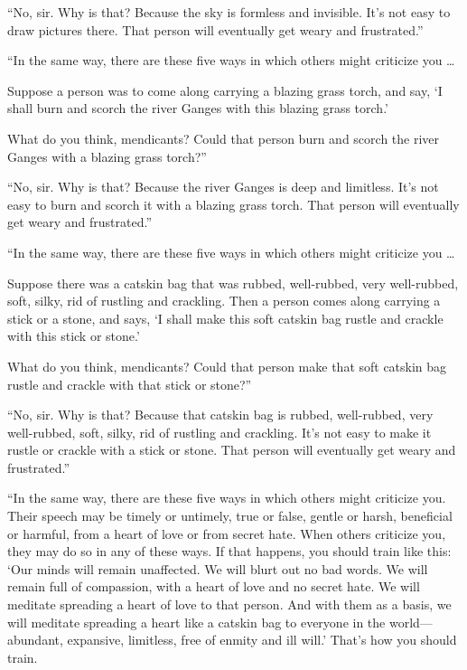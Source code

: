\documentclass[12pt,openany]{book}%
\begin{document}
“No, sir. Why is that? Because the sky is formless and invisible. It’s not easy to draw pictures there. That person will eventually get weary and frustrated.” 

“In the same way, there are these five ways in which others might criticize you … 

Suppose a person was to come along carrying a blazing grass torch, and say, ‘I shall burn and scorch the river Ganges with this blazing grass torch.’ 

What do you think, mendicants? Could that person burn and scorch the river Ganges with a blazing grass torch?” 

“No, sir. Why is that? Because the river Ganges is deep and limitless. It’s not easy to burn and scorch it with a blazing grass torch. That person will eventually get weary and frustrated.” 

“In the same way, there are these five ways in which others might criticize you … 

Suppose there was a catskin bag that was rubbed, well-rubbed, very well-rubbed, soft, silky, rid of rustling and crackling. Then a person comes along carrying a stick or a stone, and says, ‘I shall make this soft catskin bag rustle and crackle with this stick or stone.’ 

What do you think, mendicants? Could that person make that soft catskin bag rustle and crackle with that stick or stone?” 

“No, sir. Why is that? Because that catskin bag is rubbed, well-rubbed, very well-rubbed, soft, silky, rid of rustling and crackling. It’s not easy to make it rustle or crackle with a stick or stone. That person will eventually get weary and frustrated.” 

“In the same way, there are these five ways in which others might criticize you. Their speech may be timely or untimely, true or false, gentle or harsh, beneficial or harmful, from a heart of love or from secret hate. When others criticize you, they may do so in any of these ways. If that happens, you should train like this: ‘Our minds will remain unaffected. We will blurt out no bad words. We will remain full of compassion, with a heart of love and no secret hate. We will meditate spreading a heart of love to that person. And with them as a basis, we will meditate spreading a heart like a catskin bag to everyone in the world—abundant, expansive, limitless, free of enmity and ill will.’ That’s how you should train. 
\end{document}
